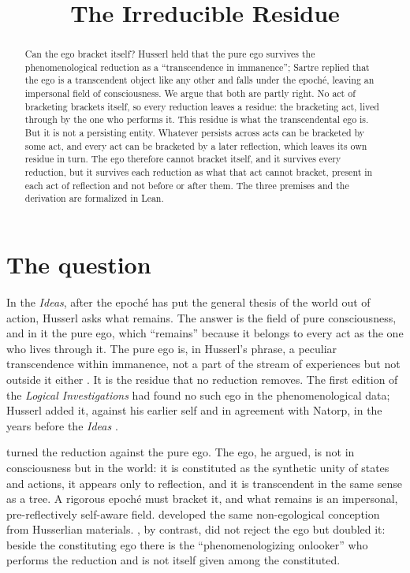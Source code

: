 \documentclass{situationist-preprint}
\title{The Irreducible Residue}
\begin{document}
\maketitle

\begin{abstract}
Can the ego bracket itself? Husserl held that the pure ego survives the phenomenological reduction as a \enquote{transcendence in immanence}; Sartre replied that the ego is a transcendent object like any other and falls under the epoché, leaving an impersonal field of consciousness. We argue that both are partly right. No act of bracketing brackets itself, so every reduction leaves a residue: the bracketing act, lived through by the one who performs it. This residue is what the transcendental ego is. But it is not a persisting entity. Whatever persists across acts can be bracketed by some act, and every act can be bracketed by a later reflection, which leaves its own residue in turn. The ego therefore cannot bracket itself, and it survives every reduction, but it survives each reduction as what that act cannot bracket, present in each act of reflection and not before or after them. The three premises and the derivation are formalized in Lean.
\end{abstract}

\section{The question}

In the \emph{Ideas}, after the epoché has put the general thesis of the world out of action, Husserl asks what remains. The answer is the field of pure consciousness, and in it the pure ego, which \enquote{remains} because it belongs to every act as the one who lives through it. The pure ego is, in Husserl's phrase, a peculiar transcendence within immanence, not a part of the stream of experiences but not outside it either \citep[§57]{Husserl1913}. It is the residue that no reduction removes. The first edition of the \emph{Logical Investigations} had found no such ego in the phenomenological data; Husserl added it, against his earlier self and in agreement with Natorp, in the years before the \emph{Ideas} \citep[ch.~2]{Zahavi2005}.

\citet{Sartre1936} turned the reduction against the pure ego. The ego, he argued, is not in consciousness but in the world: it is constituted as the synthetic unity of states and actions, it appears only to reflection, and it is transcendent in the same sense as a tree. A rigorous epoché must bracket it, and what remains is an impersonal, pre-reflectively self-aware field. \citet{Gurwitsch1941} developed the same non-egological conception from Husserlian materials. \citet{Fink1995}, by contrast, did not reject the ego but doubled it: beside the constituting ego there is the \enquote{phenomenologizing onlooker} who performs the reduction and is not itself given among the constituted.
\end{document}
